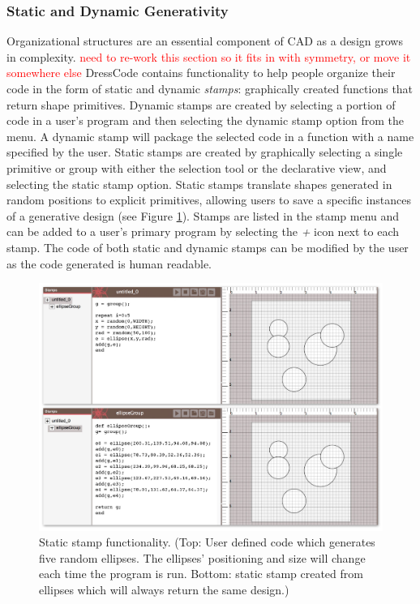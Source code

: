 \documentclass{sigchi}
\begin{document}
\subsubsection{Static and Dynamic Generativity}
Organizational structures are an essential component of CAD as a design grows in complexity. \textcolor{red}{need to re-work this section so it fits in with symmetry, or move it somewhere else} DressCode contains functionality to help people organize their code in the form of static and dynamic \textit{stamps}: graphically created functions that return shape primitives. Dynamic stamps are created by selecting a portion of code in a user's program and then selecting the dynamic stamp option from the menu. A dynamic stamp will package the selected code in a function with a name specified by the user. Static stamps are created by graphically selecting a single primitive or group with either the selection tool or the declarative view, and selecting the static stamp option. Static stamps translate shapes generated in random positions to explicit primitives, allowing users to save a specific instances of a generative design (see Figure \ref{fig:stamps}).
Stamps are listed in the stamp menu and can be added to a user's primary program by selecting the \textit{+} icon next to each stamp. The code of both static and dynamic stamps can be modified by the user as the code generated is human readable.

\begin{center}
\begin{figure}[h!]
\includegraphics[width=\columnwidth]{images/stamps.jpg}
\caption{Static stamp functionality. (Top: User defined code which generates five random ellipses. The ellipses' positioning and size will change each time the program is run. Bottom: static stamp created from ellipses which will always return the same design.)}
\label{fig:stamps}
\end{figure}
\end{center}
\vspace{-20pt}
\end{document}
